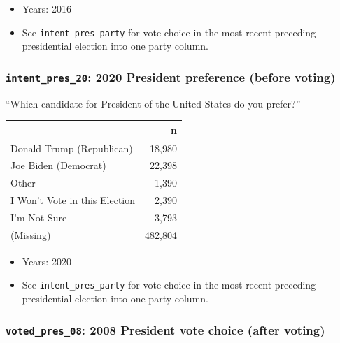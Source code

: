 \documentclass[10pt,article,oneside]{memoir}
\theoremstyle{definition}
\begin{document}
\begin{itemize}
\tightlist
\item
  Years: 2016
\item
  See \texttt{intent\_pres\_party} for vote choice in the most recent
  preceding presidential election into one party column.
\end{itemize}

\hypertarget{intent_pres_20-2020-president-preference-before-voting}{%
\subsubsection{\texorpdfstring{\texttt{intent\_pres\_20}: 2020 President
preference (before
voting)}{intent\_pres\_20: 2020 President preference (before voting)}}\label{intent_pres_20-2020-president-preference-before-voting}}

``Which candidate for President of the United States do you prefer?''

\begin{table}[H]
\centering
\begin{tabular}{lr}
\toprule
 & n\\
\midrule
Donald Trump (Republican) & 18,980\\
Joe Biden (Democrat) & 22,398\\
Other & 1,390\\
I Won't Vote in this Election & 2,390\\
I'm Not Sure & 3,793\\
(Missing) & 482,804\\
\bottomrule
\end{tabular}
\end{table}

\begin{itemize}
\tightlist
\item
  Years: 2020
\item
  See \texttt{intent\_pres\_party} for vote choice in the most recent
  preceding presidential election into one party column.
\end{itemize}

\hypertarget{voted_pres_08-2008-president-vote-choice-after-voting}{%
\subsubsection{\texorpdfstring{\texttt{voted\_pres\_08}: 2008 President
vote choice (after
voting)}{voted\_pres\_08: 2008 President vote choice (after voting)}}\label{voted_pres_08-2008-president-vote-choice-after-voting}}
\end{document}
